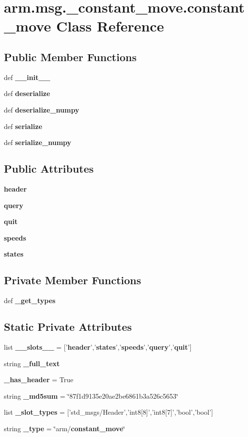 \section{arm.\-msg.\-\_\-constant\-\_\-move.\-constant\-\_\-move \-Class \-Reference}
\label{classarm_1_1msg_1_1__constant__move_1_1constant__move}
\subsection*{\-Public \-Member \-Functions}
\begin{DoxyCompactItemize}
\item 
def {\bf \-\_\-\-\_\-init\-\_\-\-\_\-}
\item 
def {\bf deserialize}
\item 
def {\bf deserialize\-\_\-numpy}
\item 
def {\bf serialize}
\item 
def {\bf serialize\-\_\-numpy}
\end{DoxyCompactItemize}
\subsection*{\-Public \-Attributes}
\begin{DoxyCompactItemize}
\item 
{\bf header}
\item 
{\bf query}
\item 
{\bf quit}
\item 
{\bf speeds}
\item 
{\bf states}
\end{DoxyCompactItemize}
\subsection*{\-Private \-Member \-Functions}
\begin{DoxyCompactItemize}
\item 
def {\bf \-\_\-get\-\_\-types}
\end{DoxyCompactItemize}
\subsection*{\-Static \-Private \-Attributes}
\begin{DoxyCompactItemize}
\item 
list {\bf \-\_\-\-\_\-slots\-\_\-\-\_\-} = ['{\bf header}','{\bf states}','{\bf speeds}','{\bf query}','{\bf quit}']
\item 
string {\bf \-\_\-full\-\_\-text}
\item 
{\bf \-\_\-has\-\_\-header} = \-True
\item 
string {\bf \-\_\-md5sum} = \char`\"{}87f1d9135e20ae2be6861b3a526c5653\char`\"{}
\item 
list {\bf \-\_\-slot\-\_\-types} = ['std\-\_\-msgs/\-Header','int8[8]','int8[7]','bool','bool']
\item 
string {\bf \-\_\-type} = \char`\"{}arm/{\bf constant\-\_\-move}\char`\"{}
\end{DoxyCompactItemize}


